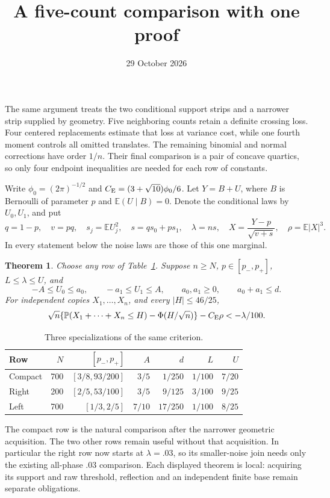 \documentclass[11pt]{article}
\title{A five-count comparison with one proof}
\author{}\date{29 October 2026}
\newcommand{\E}{\mathbb E}\newcommand{\Pp}{\mathbb P}
\newcommand{\CE}{C_{\rm E}}\newcommand{\ph}{\phi_0}
\newtheorem{theorem}{Theorem}\newtheorem{lemma}[theorem]{Lemma}
\begin{document}
\maketitle

The same argument treats the two conditional support strips and a narrower
strip supplied by geometry. Five neighboring counts retain a definite
crossing loss. Four centered replacements estimate that loss at variance
cost, while one fourth moment controls all omitted translates. The
remaining binomial and normal corrections have order $1/n$. Their final
comparison is a pair of concave quartics, so only four endpoint inequalities
are needed for each row of constants.

Write $\ph=(2\pi)^{-1/2}$ and $\CE=(3+\sqrt{10})\ph/6$.
Let $Y=B+U$, where $B$ is Bernoulli of parameter $p$ and
$\E(U\mid B)=0$. Denote the conditional laws by $U_0,U_1$, and put
\[
q=1-p,\quad v=pq,\quad s_j=\E U_j^2,\quad s=qs_0+ps_1,\quad
\lambda=ns,\quad X=\frac{Y-p}{\sqrt{v+s}},\quad\rho=\E|X|^3.
\]
In every statement below the noise laws are those of this one marginal.

\begin{theorem}\label{thm:rows}
Choose any row of Table~\ref{tab:domains}. Suppose $n\ge N$,
$p\in[p_-,p_+]$, $L\le\lambda\le U$, and
\[
-A\le U_0\le a_0,\qquad -a_1\le U_1\le A,\qquad
a_0,a_1\ge0,\qquad a_0+a_1\le d.
\]
For independent copies $X_1,\ldots,X_n$, and every $|H|\le46/25$,
\begin{equation}\label{eq:conclusion}
\sqrt n\{\Pp(X_1+\cdots+X_n\le H)-\Phi(H/\sqrt n)\}
-\CE\rho<-\lambda/100.
\end{equation}
\end{theorem}

\begin{table}[h]
\centering
\begin{tabular}{lrrrrrr}
\toprule
Row&$N$&$[p_-,p_+]$&$A$&$d$&$L$&$U$\\
\midrule
Compact&700&$[3/8,93/200]$&$3/5$&$1/250$&$1/100$&$7/20$\\
Right&200&$[2/5,53/100]$&$3/5$&$9/125$&$3/100$&$9/25$\\
Left&700&$[1/3,2/5]$&$7/10$&$17/250$&$1/100$&$8/25$\\
\bottomrule
\end{tabular}
\caption{Three specializations of the same criterion.}\label{tab:domains}
\end{table}

The compact row is the natural comparison after the narrower geometric
acquisition. The two other rows remain useful without that acquisition.
In particular the right row now starts at $\lambda=.03$, so its smaller-noise
join needs only the existing all-phase $.03$ comparison. Each displayed
theorem is local: acquiring its support and raw threshold, reflection and
an independent finite base remain separate obligations.
\end{document}
